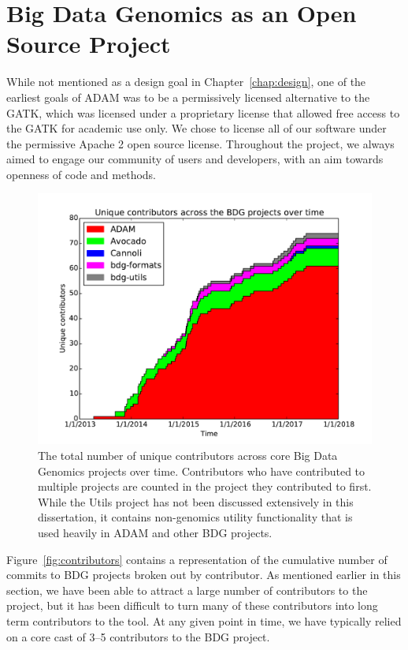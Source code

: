 \documentclass[phd]{ucbthesis}
\begin{document}
\section{Big Data Genomics as an Open Source Project}
\label{sec:oss}

While not mentioned as a design goal in Chapter~\ref{chap:design}, one of the
earliest goals of ADAM was to be a permissively licensed alternative to the
GATK, which was licensed under a proprietary license that allowed free access to
the GATK for academic use only. We chose to license all of our software under
the permissive Apache 2 open source license. Throughout the project, we always
aimed to engage our community of users and developers, with an aim towards
openness of code and methods.

\begin{figure}[h]
  \begin{center}
    \includegraphics[width=0.95\linewidth]{graphs/authors.pdf}
  \end{center}
  \caption{The total number of unique contributors across core Big Data Genomics
    projects over time. Contributors who have contributed to multiple projects
    are counted in the project they contributed to first. While the Utils
    project has not been discussed extensively in this dissertation, it contains
    non-genomics utility functionality that is used heavily in ADAM and other
    BDG projects.}
  \label{fig:oss}
\end{figure}

Figure~\ref{fig:contributors} contains a representation of the cumulative number
of commits to BDG projects broken out by contributor. As mentioned earlier in
this section, we have been able to attract a large number of contributors to the
project, but it has been difficult to turn many of these contributors into long
term contributors to the tool. At any given point in time, we have typically
relied on a core cast of 3--5 contributors to the BDG project.
\end{document}
